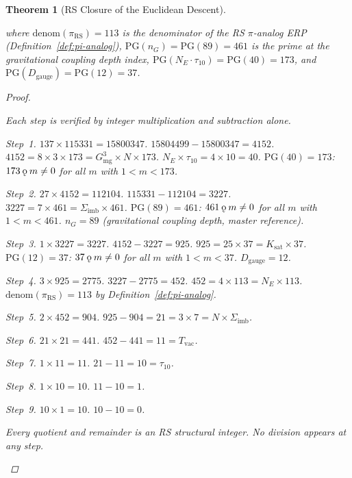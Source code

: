 \documentclass[11pt, letterpaper]{article}
\newcommand{\koppa}{\mathbin{\text{\rm\k{o}}}}
\newcommand{\Dg}{D_{\mathrm{gauge}}}
\newcommand{\Sigimb}{\Sigma_{\mathrm{imb}}}
\newcommand{\PG}{\mathrm{PG}}
\newcommand{\Gmg}{G_{\mathrm{mg}}}
\newcommand{\Ksat}{K_{\mathrm{sat}}}
\newcommand{\Tvac}{T_{\mathrm{vac}}}
\newcommand{\tauX}{\tau_{10}}
\newcommand{\nG}{n_G}
\newcommand{\piRS}{\pi_{\mathrm{RS}}}
\theoremstyle{definition}
\theoremstyle{plain}
\newtheorem{theorem}{Theorem}[section]
\begin{document}
\begin{theorem}[RS Closure of the Euclidean Descent]
\begin{rsbox}
where $\mathrm{denom}(\piRS)=113$ is the denominator of the RS $\pi$-analog ERP
(Definition~\ref{def:pi-analog}), $\PG(\nG)=\PG(89)=461$ is the prime at
the gravitational coupling depth index, $\PG(N_E\cdot\tauX)=\PG(40)=173$,
and $\PG(\Dg)=\PG(12)=37$.
\end{rsbox}
\begin{proof}
\begin{rsbox}
Each step is verified by integer multiplication and subtraction alone.

\textit{Step~1.} $137\times115331=15800347$.
$15804499-15800347=4152$.
$4152=8\times3\times173=\Gmg^3\times N\times173$.
$N_E\times\tauX=4\times10=40$.
$\PG(40)=173$: $173\koppa m\neq0$ for all $m$ with $1<m<173$.

\textit{Step~2.} $27\times4152=112104$.
$115331-112104=3227$.
$3227=7\times461=\Sigimb\times461$.
$\PG(89)=461$: $461\koppa m\neq0$ for all $m$ with $1<m<461$.
$\nG=89$ (gravitational coupling depth, master reference).

\textit{Step~3.} $1\times3227=3227$.
$4152-3227=925$.
$925=25\times37=\Ksat\times37$.
$\PG(12)=37$: $37\koppa m\neq0$ for all $m$ with $1<m<37$.
$\Dg=12$.

\textit{Step~4.} $3\times925=2775$.
$3227-2775=452$.
$452=4\times113=N_E\times113$.
$\mathrm{denom}(\piRS)=113$ by Definition~\ref{def:pi-analog}.

\textit{Step~5.} $2\times452=904$.
$925-904=21=3\times7=N\times\Sigimb$.

\textit{Step~6.} $21\times21=441$.
$452-441=11=\Tvac$.

\textit{Step~7.} $1\times11=11$.
$21-11=10=\tauX$.

\textit{Step~8.} $1\times10=10$.
$11-10=1$.

\textit{Step~9.} $10\times1=10$.
$10-10=0$.

Every quotient and remainder is an RS structural integer.
No division appears at any step.
\end{rsbox}
\end{proof}
\end{theorem}
\end{document}
